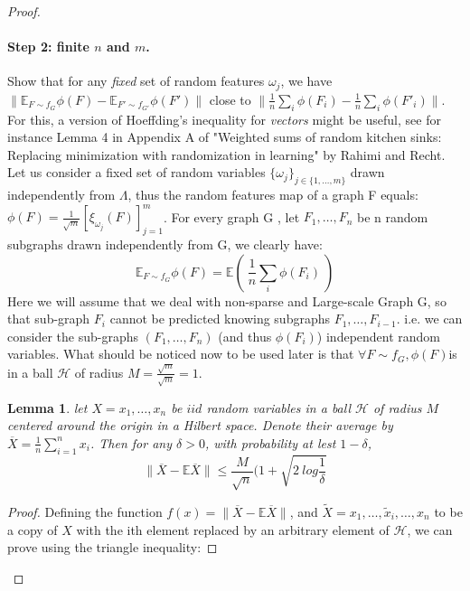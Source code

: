 \documentclass{article}
\newtheorem{lemma}{Lemma}
\begin{document}
\begin{proof}
\paragraph{Step 2: finite $n$ and $m$.} Show that for any \emph{fixed} set of random features $\omega_j$, we have $\| \mathbb{E}_{F \sim f_G} \phi(F) - \mathbb{E}_{F' \sim f_{G'}} \phi(F')\|$ close to $\| \frac{1}{n} \sum_i \phi(F_i) - \frac{1}{n} \sum_i \phi(F'_i)\|$. For this, a version of Hoeffding's inequality for \emph{vectors} might be useful, see for instance Lemma 4 in Appendix A of "Weighted sums of random kitchen sinks: Replacing minimization with randomization in learning" by Rahimi and Recht. \newline
Let us consider a fixed set of random variables $\{\omega_j\}_{j \in \{1,\ldots, m\}}$ drawn independently from $\Lambda$, thus the random features map of a graph F equals: $\phi(F) = \frac{1}{\sqrt{m}}\left[\xi_{\omega_j}(F)\right]_{j=1}^m$.\newline
For every graph G , let $F_1,\ldots, F_n$ be n random subgraphs drawn independently from G, we clearly have: 
\begin{equation}
\label{eq:subsample}
    \mathbb{E}_{F \sim f_G} \phi(F)= \mathbb{E} (~\frac{1}{n} \sum_i \phi(F_i)~)
\end{equation} 
Here we will assume that we deal with non-sparse and Large-scale Graph G, so that sub-graph $F_i$ cannot be predicted knowing subgraphs $F_1,\ldots,F_{i-1}$. i.e. we can consider the sub-graphs $(F_1,\ldots, F_n)$ (and thus $\phi(F_i)$) independent random variables. 
What should be noticed now to be used later is that $\forall F\sim f_G, \phi(F)$is in a ball $\mathcal{H}$ of radius $M=\frac{\sqrt{m}}{\sqrt{m}}=1$.
\begin{lemma}
\label{lemma:vector_hoeffding}
let $X={x_1,\ldots,x_n}$ be $iid$ random variables in a ball $\mathcal{H}$ of radius $M$ centered around the origin in a Hilbert space. Denote their average by $\overline{X}=\frac{1}{n}\sum_{i=1}^nx_i$. Then for any $\delta>0$, with probability at lest $1-\delta$, 
\begin{equation}
\label{eq:vector_hoeffding0}
  \| \overline{X}-\mathbb{E}\overline{X}\|\leq \frac{M}{\sqrt{n}}(1+\sqrt{2~log\frac{1}{\delta}}
\end{equation}
\end{lemma}
\begin{proof}
Defining the function $f(x)= \| \overline{X}-\mathbb{E}\overline{X}\|$, and $\widetilde{X}={x_1,\ldots,\widetilde{x}_i,\ldots,x_n}$ to be a copy of $X$ with the ith element replaced by an arbitrary element of $\mathcal{H}$, we can prove using the triangle inequality:

\end{proof}
\end{proof}
\end{document}
